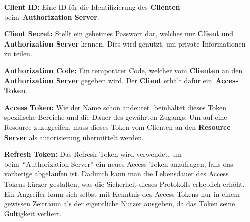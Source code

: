 \begin{itemize}
			\item[\textbf{Client ID:}] Eine ID für die Identifizierung des
			\textbf{Clienten} beim~\textbf{Authorization Server}.

			\item[\textbf{Client Secret:}] Stellt ein geheimes Passwort dar,
			welches nur \textbf{Client} und \textbf{Authorization Server} kennen.
			Dies wird genutzt, um private Informationen zu teilen.

			\item[\textbf{Authorization Code:}] Ein temporärer Code,
			welcher vom \textbf{Clienten} an den \textbf{Authorization Server} gegeben wird.
			Der \textbf{Client} erhält dafür ein~\textbf{Access Token}.

			\item[\textbf{Access Token:}] Wie der Name schon andeutet,
			beinhaltet dieses Token spezifische Bereiche
			und die Dauer des gewährten Zugangs.
			Um auf eine Resource zuzugreifen,
			muss dieses Token vom Clienten an den \textbf{Resource Server}
			als \gls{autorisierung} übermittelt werden.

			\item[\textbf{Refresh Token:}] Das Refresh Token wird verwendet,
			um beim~\enquote{Authorization Server} ein neues Access Token anzufragen,
			falls das vorherige abgelaufen ist.
			Dadurch kann man die Lebensdauer des Access Tokens kürzer gestalten,
			was die Sicherheit dieses Protokolls erheblich erhöht.
			Ein Angreifer kann sich selbst mit Kenntnis des Access Tokens nur
			in einem gewissen Zeitraum als der eigentliche
			 Nutzer ausgeben,
			da das Token seine Gültigkeit verliert.

		\end{itemize}

